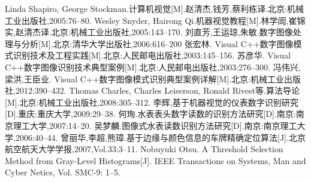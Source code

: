 \begin{thebibliography}{99}
 Linda Shapiro, George Stockman.计算机视觉[M].赵清杰,钱芳,蔡利栋译.北京:机械工业出版社,2005:76--80.
 Wesley Snyder, Hairong Qi.机器视觉教程[M].林学訚,崔锦实,赵清杰译.北京:机械工业出版社,2005:143--170.
 刘直芳,王运琼,朱敏.数字图像处理与分析[M].北京:清华大学出版社,2006:616--200
 张宏林. Visual C++数字图像模式识别技术及工程实践[M].北京:人民邮电出版社,2003:145--156.
 苏彦华. Visual C++数字图像识别技术典型案例[M].北京:人民邮电出版社,2003:276--300.
 冯伟兴,梁洪,王臣业. Visual C++数字图像模式识别典型案例详解[M].北京:机械工业出版社,2012:390--432.
 Thomas Charles, Charles Leiserson, Ronald Rivest等.算法导论[M].北京:机械工业出版社,2008:305--312.
 李辉,基于机器视觉的仪表数字识别研究[D].重庆:重庆大学,2009:29--38.
 何珣.水表表头数字读数的识别方法研究[D].南京:南京理工大学,2007:14--20.
 吴梦麟.图像式水表读数识别方法研究[D].南京:南京理工大学,2006:40--44.
 曾丽华,李超,熊璋.基于边缘与颜色信息的车牌精确定位算法[J].北京航空航天大学学报,2007,Vol.33:3--11.
 Nobuyuki Otsu. A Threshold Selection Method from Gray-Level Histograms[J]. IEEE Transactions on Systems, Man and Cyber Netics, Vol. SMC-9: 1--5.
\end{thebibliography}
